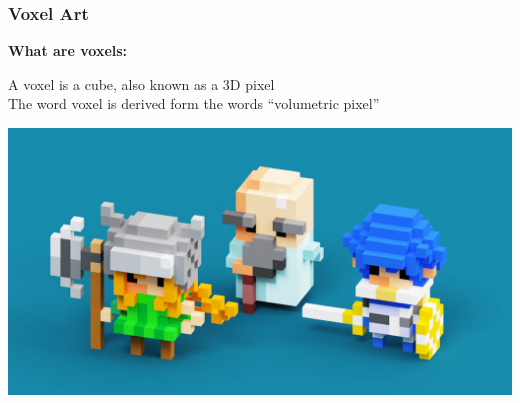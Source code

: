 \documentclass[13.5pt,aspecratio=169, xcolor=dvipsnames]{beamer}
\begin{document}

\begin{frame}
    \onehalfspacing
    \frametitle{Voxel Art}
    \textbf{What are voxels:}
    \vspace*{-1em} 
    \begin{mybox}
        A voxel is a cube, also known as a 3D pixel \\
        The word voxel is derived form the words “volumetric pixel”
      \end{mybox}

      \centering
      \includegraphics[scale=0.15]{Voxel_Art_Example.png}
\end{frame}
    
\end{document}
